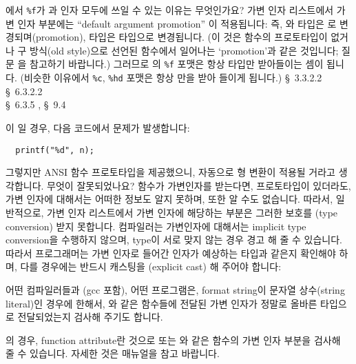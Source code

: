 \begin{faq}
	에서 \verb+%f+가 과  인자 모두에
	쓰일 수 있는 이유는 무엇인가요?
\A
	가변 인자 리스트에서 가변 인자 부분에는 ``default argument promotion''
	이 적용됩니다: 즉, 와  타입은 로
	변경되며(promotion),  타입은  타입으로
	변경됩니다.  (이 것은 함수의 프로토타입이 없거나 구 방식(old style)으로
	선언된 함수에서 일어나는 `promotion'과 같은 것입니다; 질문
	을 참고하기 바랍니다.) 그러므로
	의 \verb+%f+ 포맷은 항상  타입만 받아들이는 셈이
	됩니다.	(비슷한 이유에서 \verb+%c+, \verb+%hd+ 포맷은 항상 만을
	받아 들이게 됩니다.) 
\R
	\cite{ansi} \S\ 3.3.2.2 \\
	\cite{c89} \S\ 6.3.2.2 \\
	\cite{hs} \S\ 6.3.5 , \S\ 9.4 
\end{faq}

\begin{faq}
	이 일 경우, 다음 코드에서 문제가 발생합니다:
\begin{verbatim}
  printf("%d", n);
\end{verbatim}
	\noindent 그렇지만 ANSI 함수 프로토타입을 제공했으니, 자동으로
	형 변환이 적용될 거라고 생각합니다.  무엇이 잘못되었나요?
\A
	함수가 가변인자를 받는다면, 프로토타입이 있더라도, 가변 인자에 대해서는
	어떠한 정보도 알지 못하며, 또한 알 수도 없습니다. 따라서, 일반적으로,
        가변 인자 리스트에서 가변 인자에 해당하는 부분은 그러한
        보호를 (type conversion) 받지 못합니다.
	컴파일러는 가변인자에 대해서는 implicit type conversion을
        수행하지 않으며, type이 서로 맞지 않는 경우 경고 해 줄 수 있습니다.
        따라서 프로그래머는 가변 인자로 들어간 인자가
	예상하는 타입과 같은지 확인해야 하며, 다를 경우에는 반드시
        캐스팅을 (explicit cast) 해 주어야 합니다:

	어떤 컴파일러들과 (gcc 포함), 어떤  프로그램은,
        format string이 문자열 상수(string literal)인 경우에 한해서,
        와 같은 함수들에 전달된 가변 인자가 정말로 올바른 타입으로
        전달되었는지 검사해 주기도 합니다.

\T
	의 경우, function attribute란 것으로  또는
        와 같은 함수의 가변 인자 부분을 검사해 줄 수 있습니다.
        자세한 것은  매뉴얼을 참고 바랍니다.
\end{faq}

